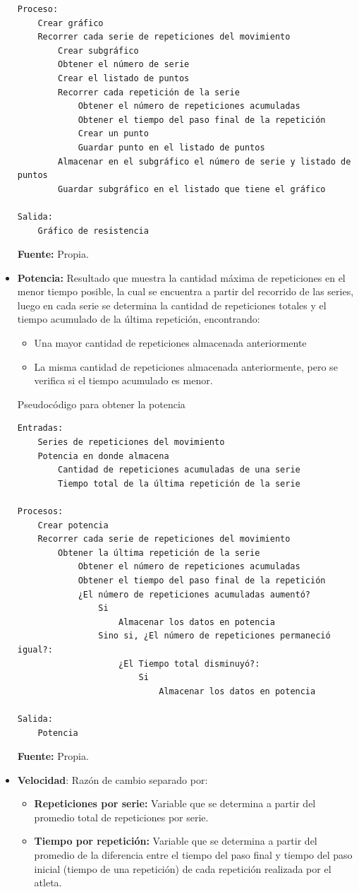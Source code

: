 \begin{itemize}
\begin{code}[H]
\begin{lstlisting}
Proceso:
	Crear gráfico
	Recorrer cada serie de repeticiones del movimiento
		Crear subgráfico
		Obtener el número de serie
		Crear el listado de puntos
		Recorrer cada repetición de la serie
			Obtener el número de repeticiones acumuladas 
			Obtener el tiempo del paso final de la repetición
			Crear un punto
			Guardar punto en el listado de puntos
		Almacenar en el subgráfico el número de serie y listado de puntos
		Guardar subgráfico en el listado que tiene el gráfico

Salida:
	Gráfico de resistencia
	\end{lstlisting}
	\textbf{Fuente:} Propia.
\end{code} 

\item \textbf{Potencia:} Resultado que muestra la cantidad m\'axima de repeticiones en el menor tiempo posible, la cual se encuentra a partir del recorrido de las series, luego en cada serie se determina la cantidad de repeticiones totales y el tiempo acumulado de la \'ultima repetici\'on, encontrando: 
	\begin{itemize}
	\item Una mayor cantidad de repeticiones almacenada anteriormente
	\item La misma cantidad de repeticiones almacenada anteriormente, pero se verifica si el tiempo acumulado es menor.
	\end{itemize}
\begin{code}[H]
	\caption{Pseudoc\'odigo para obtener la potencia}
	\label{code:getEndurance}
	\begin{lstlisting}
Entradas:
	Series de repeticiones del movimiento
	Potencia en donde almacena
		Cantidad de repeticiones acumuladas de una serie
		Tiempo total de la última repetición de la serie
		
Procesos:
	Crear potencia
	Recorrer cada serie de repeticiones del movimiento
		Obtener la última repetición de la serie
			Obtener el número de repeticiones acumuladas
			Obtener el tiempo del paso final de la repetición
			¿El número de repeticiones acumuladas aumentó?
				Si
					Almacenar los datos en potencia
				Sino si, ¿El número de repeticiones permaneció igual?:
					¿El Tiempo total disminuyó?:
						Si
							Almacenar los datos en potencia
						
Salida:
	Potencia 
	\end{lstlisting}
	\textbf{Fuente:} Propia.
\end{code} 

\item \textbf{Velocidad}: Raz\'on de cambio separado por:
	\begin{itemize}
	\item \textbf{Repeticiones por serie:} Variable que se determina a partir del promedio total de repeticiones por serie.
		\item \textbf{Tiempo por repetici\'on:} Variable que se determina a partir del promedio de la diferencia entre el tiempo del paso final y tiempo del paso inicial (tiempo de una repetici\'on) de cada repetici\'on realizada por el atleta.
	\end{itemize}
\end{itemize}


